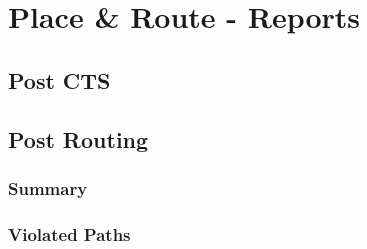 \chapter{Place \& Route - Reports}
\label{pr_rpt}

\section{Post CTS}
	
	
	
\section{Post Routing}
\subsection{Summary}
	
\subsection{Violated Paths}
	\newpage
	\newpage
	